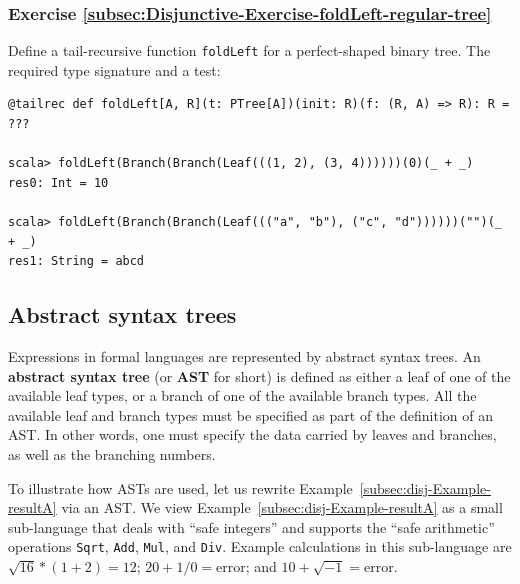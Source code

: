 \subsubsection{Exercise \label{subsec:Disjunctive-Exercise-foldLeft-regular-tree}\ref{subsec:Disjunctive-Exercise-foldLeft-regular-tree}}

Define a tail-recursive function \lstinline!foldLeft! for a perfect-shaped
binary tree. The required type signature and a test:
\begin{lstlisting}
@tailrec def foldLeft[A, R](t: PTree[A])(init: R)(f: (R, A) => R): R = ???

scala> foldLeft(Branch(Branch(Leaf(((1, 2), (3, 4))))))(0)(_ + _)
res0: Int = 10

scala> foldLeft(Branch(Branch(Leaf((("a", "b"), ("c", "d"))))))("")(_ + _)
res1: String = abcd
\end{lstlisting}

\subsection{Abstract syntax trees}

Expressions in formal languages are represented by abstract syntax
trees. An \textbf{abstract syntax tree}\textbf{
}(or \textbf{AST} for short) is defined as either a leaf of one of
the available leaf types, or a branch of one of the available branch
types. All the available leaf and branch types must be specified as
part of the definition of an AST. In other words, one must specify
the data carried by leaves and branches, as well as the branching
numbers.

To illustrate how ASTs are used, let us rewrite Example~\ref{subsec:disj-Example-resultA}
via an AST. We view Example~\ref{subsec:disj-Example-resultA} as
a small sub-language that deals with \textsf{``}safe integers\textsf{''} and supports
the \textsf{``}safe arithmetic\textsf{''} operations \lstinline!Sqrt!, \lstinline!Add!,
\lstinline!Mul!, and \lstinline!Div!. Example calculations in this
sub-language are $\sqrt{16}*(1+2)=12$; $20+1/0=\text{error}$; and
$10+\sqrt{-1}=\text{error}$. 

